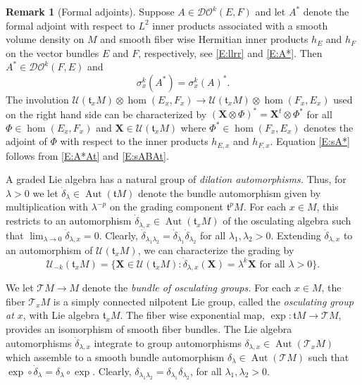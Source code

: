 \documentclass[reqno,12pt]{amsart}
\DeclareMathOperator{\Aut}{Aut}
\newcommand{\DO}{\mathcal D\mathcal O}
\theoremstyle{plain}
\theoremstyle{definition}
\newtheorem{remark}[theorem]{Remark}
\begin{document}
\begin{remark}[Formal adjoints]\label{R:sA*}
Suppose $A\in\DO^k(E,F)$ and let $A^*$ denote the formal adjoint with respect to $L^2$ inner products associated with a smooth volume density on $M$ and smooth fiber wise Hermitian inner products $h_E$ and $h_F$ on the vector bundles $E$ and $F$, respectively, see \eqref{E:llrr} and \eqref{E:A*}.
Then $A^*\in\DO^k(F,E)$ and
\begin{equation}\label{E:sA*}
\sigma_x^k(A^*)=\sigma^k_x(A)^*.
\end{equation}
The involution $\mathcal U(\mathfrak t_xM)\otimes\hom(E_x,F_x)\to\mathcal U(\mathfrak t_xM)\otimes\hom(F_x,E_x)$ used on the right hand side can be characterized by $(\mathbf X\otimes\Phi)^*=\mathbf X^t\otimes\Phi^*$ for all $\Phi\in\hom(E_x,F_x)$ and $\mathbf X\in\mathcal U(\mathfrak t_xM)$ where $\Phi^*\in\hom(F_x,E_x)$ denotes the adjoint of $\Phi$ with respect to the inner products $h_{E,x}$ and $h_{F,x}$.
Equation \eqref{E:sA*} follows from \eqref{E:A*At} and \eqref{E:sABAt}.
\end{remark}


A graded Lie algebra has a natural group of \emph{dilation automorphisms.}
Thus, for $\lambda>0$ we let $\dot\delta_\lambda\in\Aut(\mathfrak tM)$ denote the bundle automorphism given by multiplication with $\lambda^{-p}$ on the grading component $\mathfrak t^pM$.
For each $x\in M$, this restricts to an automorphism $\dot\delta_{\lambda,x}\in\Aut(\mathfrak t_xM)$ of the osculating algebra such that $\lim_{\lambda\to0}\dot\delta_{\lambda,x}=0$.
Clearly, $\dot\delta_{\lambda_1\lambda_2}=\dot\delta_{\lambda_1}\dot\delta_{\lambda_2}$ for all $\lambda_1,\lambda_2>0$.
Extending $\dot\delta_{\lambda,x}$ to an automorphism of $\mathcal U(\mathfrak t_xM)$, we can characterize the grading by
\begin{equation}\label{E:Uk}
\mathcal U_{-k}(\mathfrak t_xM)=\bigl\{\mathbf X\in\mathcal U(\mathfrak t_xM):\textrm{$\dot\delta_{\lambda,x}(\mathbf X)=\lambda^k\mathbf X$ for all $\lambda>0$}\bigr\}.
\end{equation}


We let $\mathcal TM\to M$ denote the \emph{bundle of osculating groups.}
For each $x\in M$, the fiber $\mathcal T_xM$ is a simply connected nilpotent Lie group, called the \emph{osculating group at $x$}, with Lie algebra $\mathfrak t_xM$.
The fiber wise exponential map, $\exp\colon\mathfrak tM\to\mathcal TM$, provides an isomorphism of smooth fiber bundles.
The Lie algebra automorphisms $\dot\delta_{\lambda,x}$ integrate to group automorphisms $\delta_{\lambda,x}\in\Aut(\mathcal T_xM)$ which assemble to a smooth bundle automorphism $\delta_\lambda\in\Aut(\mathcal TM)$ such that $\exp\circ\dot\delta_\lambda=\delta_\lambda\circ\exp$.
Clearly, $\delta_{\lambda_1\lambda_2}=\delta_{\lambda_1}\delta_{\lambda_2}$, for all $\lambda_1,\lambda_2>0$.
\end{document}
